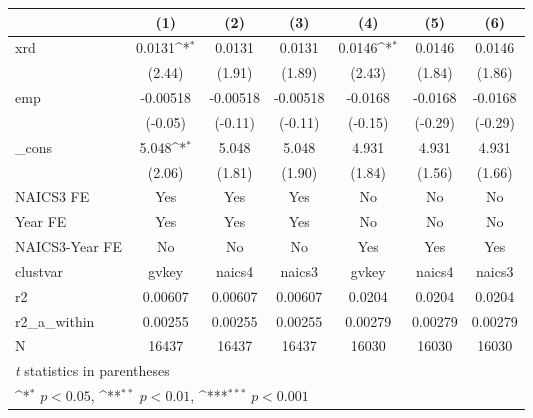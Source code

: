 {
\def\sym#1{\ifmmode^{#1}\else\(^{#1}\)\fi}
\begin{tabular}{l*{6}{c}}
\hline\hline
            &\multicolumn{1}{c}{(1)}         &\multicolumn{1}{c}{(2)}         &\multicolumn{1}{c}{(3)}         &\multicolumn{1}{c}{(4)}         &\multicolumn{1}{c}{(5)}         &\multicolumn{1}{c}{(6)}         \\
\hline
xrd         &      0.0131\sym{*}  &      0.0131         &      0.0131         &      0.0146\sym{*}  &      0.0146         &      0.0146         \\
            &      (2.44)         &      (1.91)         &      (1.89)         &      (2.43)         &      (1.84)         &      (1.86)         \\
[1em]
emp         &    -0.00518         &    -0.00518         &    -0.00518         &     -0.0168         &     -0.0168         &     -0.0168         \\
            &     (-0.05)         &     (-0.11)         &     (-0.11)         &     (-0.15)         &     (-0.29)         &     (-0.29)         \\
[1em]
\_cons      &       5.048\sym{*}  &       5.048         &       5.048         &       4.931         &       4.931         &       4.931         \\
            &      (2.06)         &      (1.81)         &      (1.90)         &      (1.84)         &      (1.56)         &      (1.66)         \\
[1em]
NAICS3 FE   &         Yes         &         Yes         &         Yes         &          No         &          No         &          No         \\
[1em]
Year FE     &         Yes         &         Yes         &         Yes         &          No         &          No         &          No         \\
[1em]
NAICS3-Year FE&          No         &          No         &          No         &         Yes         &         Yes         &         Yes         \\
\hline
clustvar    &       gvkey         &      naics4         &      naics3         &       gvkey         &      naics4         &      naics3         \\
r2          &     0.00607         &     0.00607         &     0.00607         &      0.0204         &      0.0204         &      0.0204         \\
r2\_a\_within &     0.00255         &     0.00255         &     0.00255         &     0.00279         &     0.00279         &     0.00279         \\
N           &       16437         &       16437         &       16437         &       16030         &       16030         &       16030         \\
\hline\hline
\multicolumn{7}{l}{\footnotesize \textit{t} statistics in parentheses}\\
\multicolumn{7}{l}{\footnotesize \sym{*} \(p<0.05\), \sym{**} \(p<0.01\), \sym{***} \(p<0.001\)}\\
\end{tabular}
}
